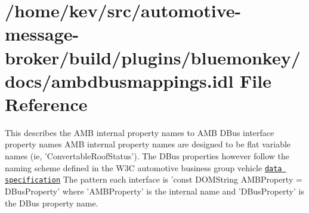 \hypertarget{ambdbusmappings_8idl}{\section{/home/kev/src/automotive-\/message-\/broker/build/plugins/bluemonkey/docs/ambdbusmappings.idl File Reference}
\label{ambdbusmappings_8idl}
}


This describes the A\+M\+B internal property names to A\+M\+B D\+Bus interface property names A\+M\+B internal property names are designed to be flat variable names (ie, 'Convertable\+Roof\+Status'). The D\+Bus properties however follow the naming scheme defined in the W3\+C automotive business group vehicle \href{http://w3c.github.io/automotive-bg/data_spec.html}{\tt data specification} The pattern each interface is 'const D\+O\+M\+String A\+M\+B\+Property = D\+Bus\+Property' where 'A\+M\+B\+Property' is the internal name and 'D\+Bus\+Property' is the D\+Bus property name.  



